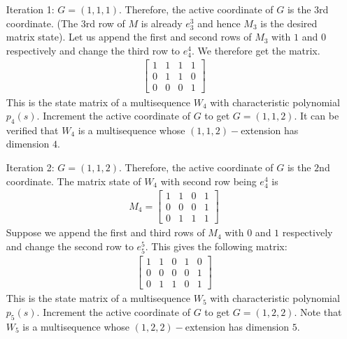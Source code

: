 \documentclass[letterpaper, 12 pt]{article}  \usepackage{amssymb}
\begin{document}
\begin{enumerate}
 \item[Iteration 1:] $G = (1,1,1)$. Therefore, the active coordinate of $G$
is the $3$rd coordinate. (The $3$rd row of $M$ is already $e_3^3$ and hence
$M_3$ is the desired matrix state).  
Let us append the first and second rows of $M_3$ with $1$ and $0$ respectively and
change the third row to $e_4^4$. We therefore get the matrix.
\begin{eqnarray*}
  \left[\begin{matrix}
  1 & 1 & 1 & 1\\
  0 & 1 & 1 & 0\\
  0 & 0 & 0 & 1 
 \end{matrix}
\right]
\end{eqnarray*}
  This is the state matrix of a multisequence $W_4$ with characteristic
polynomial $p_4(s)$. Increment the active coordinate of $G$ to get $G =
(1,1,2)$. It can be verified that $W_4$ is a multisequence whose $(1,1,2)-$extension has dimension $4$.

 \item[Iteration 2:] $G = (1,1,2)$. Therefore, the active coordinate of $G$ is
the $2$nd coordinate. The matrix state of $W_4$ with second row being $e_4^4$
is 
\begin{eqnarray*}
 M_4 =  \left[\begin{matrix}
  1 & 1 & 0 & 1\\
  0 & 0 & 0 & 1\\
  0 & 1 & 1 & 1 
 \end{matrix}
\right]
\end{eqnarray*}
Suppose we append the first and third rows of $M_4$ with $0$ and $1$ respectively and
change the second row to $e_5^5$. This gives the following matrix:
 \begin{eqnarray*}
   \left[\begin{matrix}
  1 & 1 & 0 & 1 & 0\\
  0 & 0 & 0 & 0 & 1\\
  0 & 1 & 1 & 0 & 1 
 \end{matrix}
\right]
\end{eqnarray*}
 This is the state matrix of a multisequence $W_5$ with characteristic
polynomial $p_5(s)$. Increment
the active coordinate of $G$ to get $G =
(1,2,2)$. Note that $W_5$ is a multisequence whose $(1,2,2)-$extension has dimension $5$.


\end{enumerate}
\end{document}
